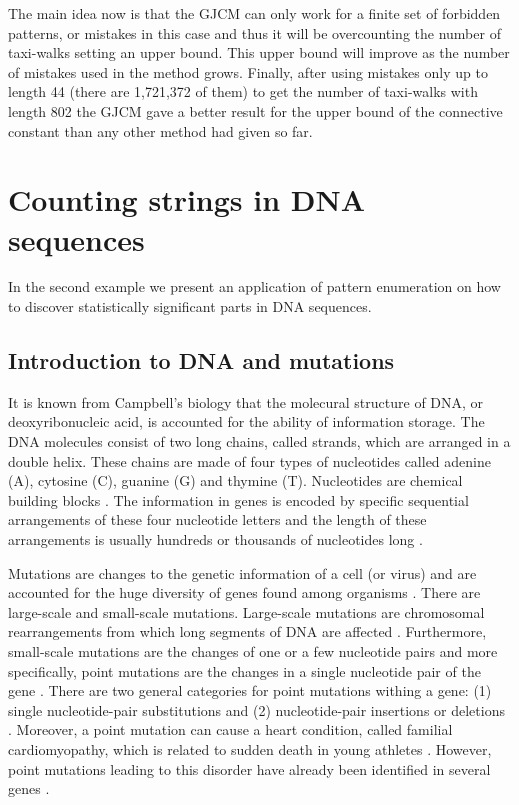 \documentclass[12pt]{report}
\begin{document}
{{\noindent The main idea now is that the GJCM can only work for a finite set of forbidden patterns, or mistakes in this case and thus it will be overcounting the number of taxi-walks setting an upper bound. This upper bound will improve as the number of mistakes used in the method grows. Finally, after using mistakes only up to length 44 (there are 1,721,372 of them) to get the number of taxi-walks with length 802 the GJCM gave a better result for the upper bound of the connective constant than any other method had given so far.


\section{Counting strings in DNA sequences}

\noindent In the second example we present an application of pattern enumeration on how to discover statistically significant parts in DNA sequences.

\subsection{Introduction to DNA and mutations}
It is known from Campbell's biology \cite{B2011} that the molecural structure of DNA, or deoxyribonucleic acid, is accounted for the ability of information storage. The DNA molecules consist of two long chains, called strands, which are arranged in a double helix. These chains are made of four types of nucleotides called adenine (A), cytosine (C), guanine (G) and thymine (T). Nucleotides are chemical building blocks \cite{B2011}. The information in genes is encoded by specific sequential arrangements of these four nucleotide letters and the length of these arrangements is usually hundreds or thousands of nucleotides long \cite{B2011}.

Mutations are changes to the genetic information of a cell (or virus) and are accounted for the huge diversity of genes found among organisms \cite{B2011}. There are large-scale and small-scale mutations. Large-scale mutations are chromosomal rearrangements from which long segments of DNA are affected \cite{B2011}. Furthermore, small-scale mutations are the changes of one or a few nucleotide pairs and more specifically, point mutations are the changes in a single nucleotide pair of the gene \cite{B2011}. There are two general categories for point mutations withing a gene: (1) single nucleotide-pair substitutions and (2) nucleotide-pair insertions or deletions \cite{B2011}. Moreover, a point mutation can cause a heart condition, called familial cardiomyopathy, which is related to sudden death in young athletes \cite{B2011}. However, point mutations leading to this disorder have already been identified in several genes \cite{B2011}.

}}
\end{document}
